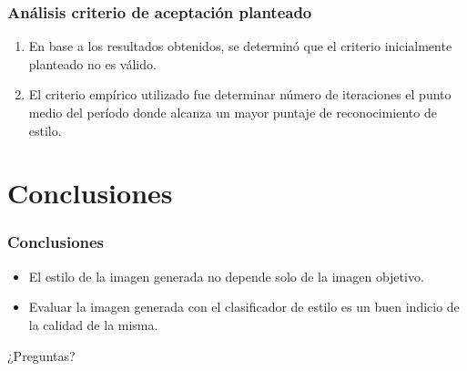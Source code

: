 \documentclass[10pt,center]{beamer}
\begin{document}
\begin{frame}
  \frametitle{Análisis criterio de aceptación planteado}
  \begin{enumerate}
    \item En base a los resultados obtenidos, se determinó que el criterio inicialmente planteado no es válido.
    \item El criterio empírico utilizado fue determinar número de iteraciones el punto medio del período donde alcanza un mayor puntaje de reconocimiento de estilo.
  \end{enumerate}
\end{frame}

\section{Conclusiones}
\begin{frame}
  \frametitle{Conclusiones}
  \begin{itemize}
    \item El estilo de la imagen generada no depende solo de la imagen objetivo.
    \item Evaluar la imagen generada con el clasificador de estilo es un buen indicio de la calidad de la misma.
  \end{itemize}

\end{frame}

\begin{frame}
  \vspace{1.5cm}
 {\Huge ¿Preguntas?}
\end{frame}
\end{document}
